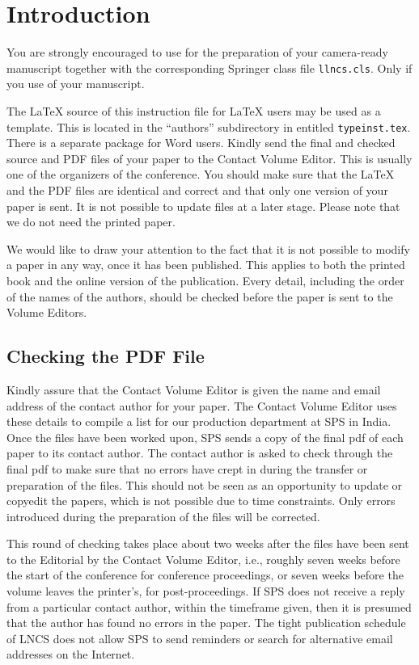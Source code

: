 \section{Introduction}


You are strongly encouraged to use \LaTeXe{} for the
preparation of your camera-ready manuscript together with the
corresponding Springer class file \verb+llncs.cls+. Only if you use
of your manuscript.


The \LaTeX{} source of this instruction file for \LaTeX{} users may be
used as a template. This is
located in the ``authors'' subdirectory in
entitled \texttt{typeinst.tex}. There is a separate package for Word 
users. Kindly send the final and checked source
and PDF files of your paper to the Contact Volume Editor. This is
usually one of the organizers of the conference. You should make sure
that the \LaTeX{} and the PDF files are identical and correct and that
only one version of your paper is sent. It is not possible to update
files at a later stage. Please note that we do not need the printed
paper.


We would like to draw your attention to the fact that it is not possible
to modify a paper in any way, once it has been published. This applies
to both the printed book and the online version of the publication.
Every detail, including the order of the names of the authors, should
be checked before the paper is sent to the Volume Editors.


\subsection{Checking the PDF File}


Kindly assure that the Contact Volume Editor is given the name and email
address of the contact author for your paper. The Contact Volume Editor
uses these details to compile a list for our production department at
SPS in India. Once the files have been worked upon, SPS sends a copy of
the final pdf of each paper to its contact author. The contact author is
asked to check through the final pdf to make sure that no errors have
crept in during the transfer or preparation of the files. This should
not be seen as an opportunity to update or copyedit the papers, which is
not possible due to time constraints. Only errors introduced during the
preparation of the files will be corrected.


This round of checking takes place about two weeks after the files have
been sent to the Editorial by the Contact Volume Editor, i.e., roughly
seven weeks before the start of the conference for conference
proceedings, or seven weeks before the volume leaves the printer's, for
post-proceedings. If SPS does not receive a reply from a particular
contact author, within the timeframe given, then it is presumed that the
author has found no errors in the paper. The tight publication schedule
of LNCS does not allow SPS to send reminders or search for alternative
email addresses on the Internet.


